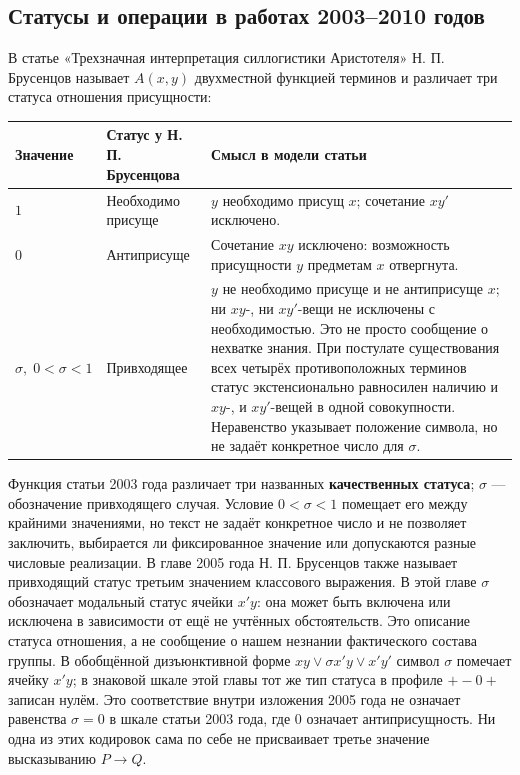 \documentclass[12pt,a4paper]{article}
\begin{document}
\newpage
\subsection{Статусы и операции в работах 2003–2010 годов}

В статье «Трехзначная интерпретация силлогистики Аристотеля» Н. П. Брусенцов называет \(A(x,y)\) двухместной функцией терминов и различает три статуса отношения присущности:

\begin{center}
\begin{tabular}{P{.17\linewidth}P{.34\linewidth}P{.40\linewidth}}
\toprule
\textbf{Значение} & \textbf{Статус у Н. П. Брусенцова} & \textbf{Смысл в модели статьи} \\
\midrule
\(1\) & Необходимо присуще & \(y\) необходимо присущ \(x\); сочетание \(xy'\) исключено. \\
\(0\) & Антиприсуще & Сочетание \(xy\) исключено: возможность присущности \(y\) предметам \(x\) отвергнута. \\
\(\sigma,\;0<\sigma<1\) & Привходящее & \(y\) не необходимо присуще и не антиприсуще \(x\); ни \(xy\)-, ни \(xy'\)-вещи не исключены с необходимостью. Это не просто сообщение о нехватке знания. При постулате существования всех четырёх противоположных терминов статус экстенсионально равносилен наличию и \(xy\)-, и \(xy'\)-вещей в одной совокупности. Неравенство указывает положение символа, но не задаёт конкретное число для \(\sigma\). \\
\bottomrule
\end{tabular}
\end{center}

Функция статьи 2003 года различает три названных \textbf{качественных статуса}; \(\sigma\) — обозначение привходящего случая. Условие \(0<\sigma<1\) помещает его между крайними значениями, но текст не задаёт конкретное число и не позволяет заключить, выбирается ли фиксированное значение или допускаются разные числовые реализации. В главе 2005 года Н. П. Брусенцов также называет привходящий статус третьим значением классового выражения. В этой главе \(\sigma\) обозначает модальный статус ячейки \(x'y\): она может быть включена или исключена в зависимости от ещё не учтённых обстоятельств. Это описание статуса отношения, а не сообщение о нашем незнании фактического состава группы. В обобщённой дизъюнктивной форме \(xy\lor\sigma x'y\lor x'y'\) символ \(\sigma\) помечает ячейку \(x'y\); в знаковой шкале этой главы тот же тип статуса в профиле \(+-0+\) записан нулём. Это соответствие внутри изложения 2005 года не означает равенства \(\sigma=0\) в шкале статьи 2003 года, где \(0\) означает антиприсущность. Ни одна из этих кодировок сама по себе не присваивает третье значение высказыванию \(P\to Q\).
\end{document}
